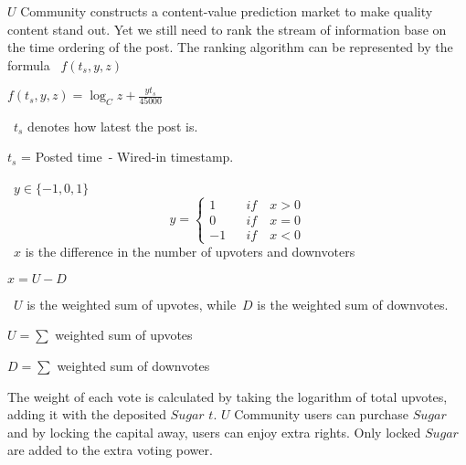 $U$ Community constructs a content-value prediction market to make quality content stand out. Yet we still need to rank the stream of information base on the time ordering of the post. The ranking algorithm can be represented by the formula \ $f(t_s,y,z)$
\begin{center}
$f(t_s,y,z) = \log_{C} z + \frac{yt_s}{45000}$
\end{center}
\  $t_s$ denotes how latest the post is. 
\begin{center}
    $t_s$ = Posted time\ - Wired-in timestamp. 
\end{center}
\ $y \in \{-1,0,1\}$
$$y =\left\{
\begin{array}{rcl}
1       &      & {if \quad x > 0}\\
0     &      & {if \quad x = 0}\\
-1     &      & {if \quad x < 0}
\end{array} \right. $$
\ $x$ is the difference in the number of upvoters and downvoters
\begin{center}
        $x = U - D$
\end{center}
\  $U$ is the weighted sum of upvotes, while\ $D$ is the weighted sum of downvotes. 
\begin{center}
$U = \sum$ {weighted sum of upvotes} 
\end{center}
\begin{center}
$D = \sum$ {weighted sum of downvotes} 
\end{center}
The weight of each vote is calculated by taking the logarithm of total upvotes, adding it with the deposited $Sugar$ $t$.
$U$ Community users can purchase $Sugar$ and by locking the capital away, users can enjoy extra rights. Only locked $Sugar$ are added to the extra voting power. \par

